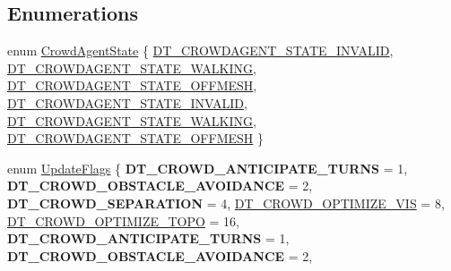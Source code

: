 \subsection*{Enumerations}
\begin{DoxyCompactItemize}
\item 
enum \hyperlink{group__crowd_ga59bc9aa54705292d8f0f1ad9ca48ca82}{Crowd\+Agent\+State} \{ \newline
\hyperlink{group__crowd_gga59bc9aa54705292d8f0f1ad9ca48ca82ac2abcf7abcdba5abeda5801fc771baa8}{D\+T\+\_\+\+C\+R\+O\+W\+D\+A\+G\+E\+N\+T\+\_\+\+S\+T\+A\+T\+E\+\_\+\+I\+N\+V\+A\+L\+ID}, 
\hyperlink{group__crowd_gga59bc9aa54705292d8f0f1ad9ca48ca82ab165ebb808ee9390c7f7ec9f5ea277ec}{D\+T\+\_\+\+C\+R\+O\+W\+D\+A\+G\+E\+N\+T\+\_\+\+S\+T\+A\+T\+E\+\_\+\+W\+A\+L\+K\+I\+NG}, 
\hyperlink{group__crowd_gga59bc9aa54705292d8f0f1ad9ca48ca82a4194d4934f447526177f505e93c96fec}{D\+T\+\_\+\+C\+R\+O\+W\+D\+A\+G\+E\+N\+T\+\_\+\+S\+T\+A\+T\+E\+\_\+\+O\+F\+F\+M\+E\+SH}, 
\hyperlink{group__crowd_gga59bc9aa54705292d8f0f1ad9ca48ca82ac2abcf7abcdba5abeda5801fc771baa8}{D\+T\+\_\+\+C\+R\+O\+W\+D\+A\+G\+E\+N\+T\+\_\+\+S\+T\+A\+T\+E\+\_\+\+I\+N\+V\+A\+L\+ID}, 
\newline
\hyperlink{group__crowd_gga59bc9aa54705292d8f0f1ad9ca48ca82ab165ebb808ee9390c7f7ec9f5ea277ec}{D\+T\+\_\+\+C\+R\+O\+W\+D\+A\+G\+E\+N\+T\+\_\+\+S\+T\+A\+T\+E\+\_\+\+W\+A\+L\+K\+I\+NG}, 
\hyperlink{group__crowd_gga59bc9aa54705292d8f0f1ad9ca48ca82a4194d4934f447526177f505e93c96fec}{D\+T\+\_\+\+C\+R\+O\+W\+D\+A\+G\+E\+N\+T\+\_\+\+S\+T\+A\+T\+E\+\_\+\+O\+F\+F\+M\+E\+SH}
 \}
\item 
enum \hyperlink{group__crowd_gaa94b67d2fdcc390690c523f28019e52f}{Update\+Flags} \{ \newline
{\bfseries D\+T\+\_\+\+C\+R\+O\+W\+D\+\_\+\+A\+N\+T\+I\+C\+I\+P\+A\+T\+E\+\_\+\+T\+U\+R\+NS} = 1, 
{\bfseries D\+T\+\_\+\+C\+R\+O\+W\+D\+\_\+\+O\+B\+S\+T\+A\+C\+L\+E\+\_\+\+A\+V\+O\+I\+D\+A\+N\+CE} = 2, 
{\bfseries D\+T\+\_\+\+C\+R\+O\+W\+D\+\_\+\+S\+E\+P\+A\+R\+A\+T\+I\+ON} = 4, 
\hyperlink{group__crowd_ggaa94b67d2fdcc390690c523f28019e52fad11f447facf1bf42c09de64e9483f3aa}{D\+T\+\_\+\+C\+R\+O\+W\+D\+\_\+\+O\+P\+T\+I\+M\+I\+Z\+E\+\_\+\+V\+IS} = 8, 
\newline
\hyperlink{group__crowd_ggaa94b67d2fdcc390690c523f28019e52fa89c6f7f2e49254e775cb2b85259a0a93}{D\+T\+\_\+\+C\+R\+O\+W\+D\+\_\+\+O\+P\+T\+I\+M\+I\+Z\+E\+\_\+\+T\+O\+PO} = 16, 
{\bfseries D\+T\+\_\+\+C\+R\+O\+W\+D\+\_\+\+A\+N\+T\+I\+C\+I\+P\+A\+T\+E\+\_\+\+T\+U\+R\+NS} = 1, 
{\bfseries D\+T\+\_\+\+C\+R\+O\+W\+D\+\_\+\+O\+B\+S\+T\+A\+C\+L\+E\+\_\+\+A\+V\+O\+I\+D\+A\+N\+CE} = 2, 

\end{DoxyCompactItemize}
